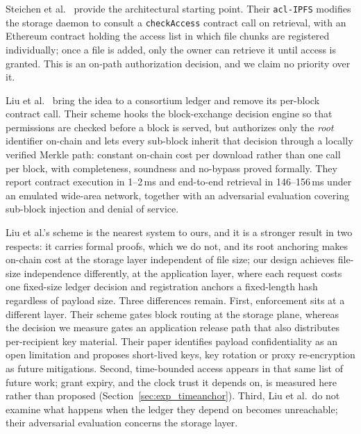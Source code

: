 \documentclass[preprint,12pt]{elsarticle}
\begin{document}
Steichen et al.~\cite{steichen2018blockchain} provide the architectural
starting point. Their \texttt{acl-IPFS} modifies the storage daemon to consult a
\texttt{checkAccess} contract call on retrieval, with an Ethereum contract
holding the access list in which file chunks are registered individually;
once a file is added, only the owner can retrieve it until access is
granted. This is an on-path authorization
decision, and we claim no priority over it.

Liu et al.~\cite{liu2026rbacipfs} bring the idea to a consortium ledger and
remove its per-block contract call. Their scheme hooks the block-exchange
decision engine so that permissions are checked before a block is served, but
authorizes only the \emph{root} identifier on-chain and lets every sub-block
inherit that decision through a locally verified Merkle path: constant on-chain cost per download rather than one call per block, with completeness,
soundness and no-bypass proved formally. They report contract execution in
1--2\,ms and end-to-end retrieval in 146--156\,ms under an emulated wide-area
network, together with an adversarial evaluation covering sub-block injection
and denial of service.

Liu et al.'s scheme is the nearest system to ours, and it is a stronger
result in two respects: it carries formal proofs, which we do not, and its root anchoring
makes on-chain cost at the storage layer independent of file size; our
design achieves file-size independence differently, at the application layer,
where each request costs one fixed-size ledger decision and registration
anchors a fixed-length hash regardless of payload size. Three
differences remain. First, enforcement sits at a different layer. Their scheme
gates block routing at the storage plane, whereas the decision we measure gates
an application release path that also distributes per-recipient key material.
Their paper identifies payload confidentiality as an open limitation and
proposes short-lived keys, key rotation or proxy re-encryption as future
mitigations. Second, time-bounded
access appears in that same list of future work; grant expiry, and the clock
trust it depends on, is measured here rather than proposed
(Section~\ref{sec:exp_timeanchor}). Third, Liu et al.\ do not examine what
happens when the ledger they depend on becomes unreachable; their adversarial
evaluation concerns the storage layer.
\end{document}
